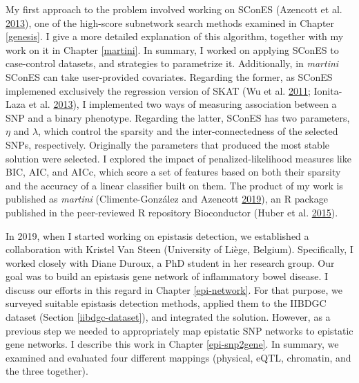 \documentclass[
  11pt,
]{env/yjiao}
\begin{document}
My first approach to the problem involved working on SConES (Azencott et al. \protect\hyperlink{ref-azencott_efficient_2013}{2013}), one of the high-score subnetwork search methods examined in Chapter \ref{genesis}. I give a more detailed explanation of this algorithm, together with my work on it in Chapter \ref{martini}. In summary, I worked on applying SConES to case-control datasets, and strategies to parametrize it. Additionally, in \emph{martini} SConES can take user-provided covariates. Regarding the former, as SConES implemened exclusively the regression version of SKAT (Wu et al. \protect\hyperlink{ref-wu_rare-variant_2011}{2011}; Ionita-Laza et al. \protect\hyperlink{ref-ionita-laza_sequence_2013}{2013}), I implemented two ways of measuring association between a SNP and a binary phenotype. Regarding the latter, SConES has two parameters, \(\eta\) and \(\lambda\), which control the sparsity and the inter-connectedness of the selected SNPs, respectively. Originally the parameters that produced the most stable solution were selected. I explored the impact of penalized-likelihood measures like BIC, AIC, and AICc, which score a set of features based on both their sparsity and the accuracy of a linear classifier built on them. The product of my work is published as \emph{martini} (Climente-González and Azencott \protect\hyperlink{ref-martini}{2019}), an R package published in the peer-reviewed R repository Bioconductor (Huber et al. \protect\hyperlink{ref-bioconductor}{2015}).

In 2019, when I started working on epistasis detection, we established a collaboration with Kristel Van Steen (University of Liège, Belgium). Specifically, I worked closely with Diane Duroux, a PhD student in her research group. Our goal was to build an epistasis gene network of inflammatory bowel disease. I discuss our efforts in this regard in Chapter \ref{epi-network}. For that purpose, we surveyed suitable epistasis detection methods, applied them to the IIBDGC dataset (Section \ref{iibdgc-dataset}), and integrated the solution. However, as a previous step we needed to appropriately map epistatic SNP networks to epistatic gene networks. I describe this work in Chapter \ref{epi-snp2gene}. In summary, we examined and evaluated four different mappings (physical, eQTL, chromatin, and the three together).
\end{document}
